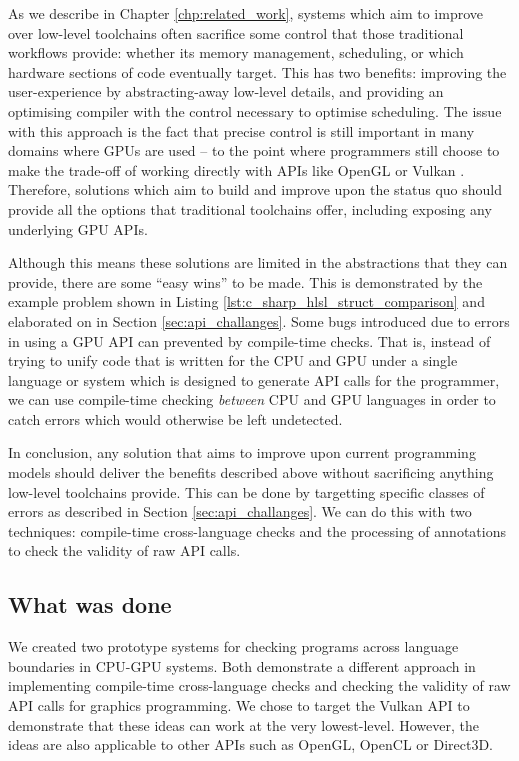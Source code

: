 \documentclass[a4paper,12pt,twoside,openright]{report}
\begin{document}
As we describe in Chapter \ref{chp:related_work}, systems which aim to improve
over low-level toolchains often sacrifice some control that those traditional
workflows provide: whether its memory management, scheduling, or which hardware
sections of code eventually target. This has two benefits: improving the
user-experience by abstracting-away low-level details, and providing an
optimising compiler with the control necessary to optimise scheduling. The
issue with this approach is the fact that precise control is still important in
many domains where GPUs are used -- to the point where programmers still choose
to make the trade-off of working directly with APIs like OpenGL or Vulkan
\cite{TODO}. Therefore, solutions which aim to build and improve upon the
status quo should provide all the options that traditional toolchains offer,
including exposing any underlying GPU APIs.

Although this means these solutions are limited in the abstractions that they
can provide, there are some ``easy wins'' to be made. This is demonstrated by
the example problem shown in Listing \ref{lst:c_sharp_hlsl_struct_comparison}
and elaborated on in Section \ref{sec:api_challanges}. Some bugs introduced due
to errors in using a GPU API can prevented by compile-time checks. That is,
instead of trying to unify code that is written for the CPU and GPU under a
single language or system which is designed to generate API calls for the
programmer, we can use compile-time checking \textit{between} CPU and GPU
languages in order to catch errors which would otherwise be left undetected.

In conclusion, any solution that aims to improve upon current programming
models should deliver the benefits described above without sacrificing anything
low-level toolchains provide. This can be done by targetting specific classes of
errors as described in Section \ref{sec:api_challanges}. We can do this with
two techniques: compile-time cross-language checks and the processing of
annotations to check the validity of raw API calls.

\subsection{What was done}

We created two prototype systems for checking programs across language
boundaries in CPU-GPU systems. Both demonstrate a different approach in
implementing compile-time cross-language checks and checking the validity of
raw API calls for graphics programming. We chose to target the Vulkan API to
demonstrate that these ideas can work at the very lowest-level. However, the
ideas are also applicable to other APIs such as OpenGL, OpenCL or Direct3D.
\end{document}
